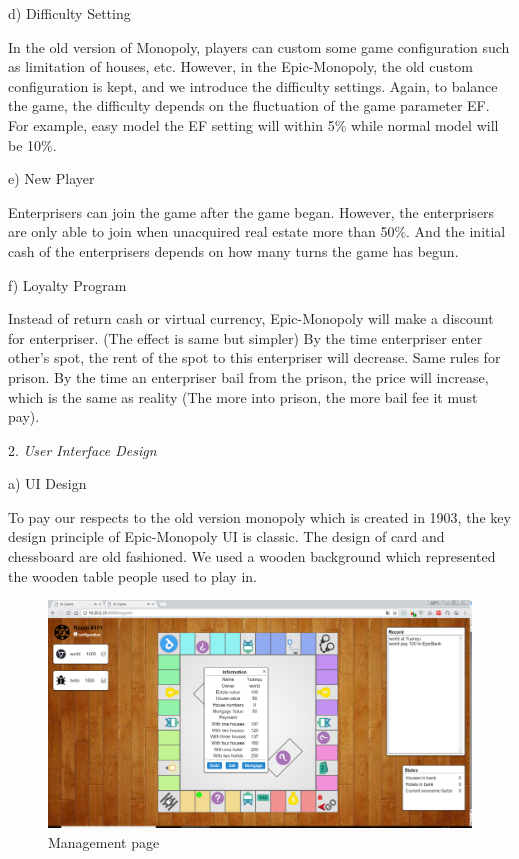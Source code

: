 \documentclass[a4paper,11pt]{article}
\begin{document}
d)	Difficulty Setting

In the old version of Monopoly, players can custom some game configuration such as limitation of houses, etc. However, in the Epic-Monopoly, the old custom configuration is kept, and we introduce the difficulty settings. Again, to balance the game, the difficulty depends on the fluctuation of the game parameter EF. For example, easy model the EF setting will within 5\% while normal model will be 10\%. 

e)	New Player

Enterprisers can join the game after the game began. However, the enterprisers are only able to join when unacquired real estate more than 50\%. And the initial cash of the enterprisers depends on how many turns the game has begun.

f)	Loyalty Program

Instead of return cash or virtual currency, Epic-Monopoly will make a discount for enterpriser. (The effect is same but simpler) By the time enterpriser enter other's spot, the rent of the spot to this enterpriser will decrease. Same rules for prison. By the time an enterpriser bail from the prison, the price will increase, which is the same as reality (The more into prison, the more bail fee it must pay).

2.	\emph{User Interface Design}

a)	UI Design

To pay our respects to the old version monopoly which is created in 1903, the key design principle of Epic-Monopoly UI is classic. The design of card and chessboard are old fashioned. We used a wooden background which represented the wooden table people used to play in. 
\begin{figure}
\includegraphics[scale=0.32]{image/ingame2.png}
\caption{Management page}
\end{figure}
\end{document}
